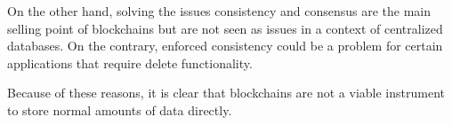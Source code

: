 \iffalse
- because in a context of centralized database, consistency and consensus as are not issues. Solving these problems is the main selling point of blockchain. Although it might be interesting that blockchain provides consistency, this could also be a problem. Some centralized databases might require delete functionality. This is no possible when using a blockchain

- not viable for storage of normal amounts of data
\fi

On the other hand, solving the issues consistency and consensus are the main selling point of blockchains but are not seen as issues in a context of centralized databases. On the contrary, enforced consistency could be a problem for certain applications that require delete functionality.

Because of these reasons, it is clear that blockchains are not a viable instrument to store normal amounts of data directly.